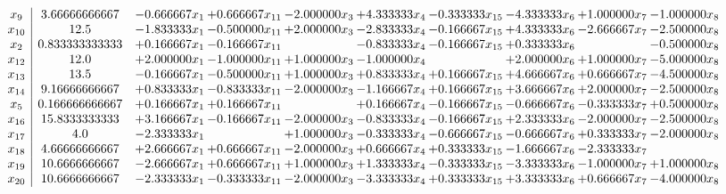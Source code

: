 \documentclass[10pt]{article}
\begin{document}
 \[\begin{array}{c| c c@{\hskip 2pt} c@{\hskip 2pt} c@{\hskip 2pt} c@{\hskip 2pt} c@{\hskip 2pt} c@{\hskip 2pt} c@{\hskip 2pt} c@{\hskip 2pt} }
 x_{9}   &  3.66666666667 & -0.666667 x_{1} & + 0.666667 x_{11} & -2.000000 x_{3} & + 4.333333 x_{4} & -0.333333 x_{15} & -4.333333 x_{6} & + 1.000000 x_{7} & -1.000000 x_{8}\\
 x_{10}   &  12.5 & -1.833333 x_{1} & -0.500000 x_{11} & + 2.000000 x_{3} & -2.833333 x_{4} & -0.166667 x_{15} & + 4.333333 x_{6} & -2.666667 x_{7} & -2.500000 x_{8}\\
 x_{2}   &  0.833333333333 & + 0.166667 x_{1} & -0.166667 x_{11} &   & -0.833333 x_{4} & -0.166667 x_{15} & + 0.333333 x_{6} &   & -0.500000 x_{8}\\
 x_{12}   &  12.0 & + 2.000000 x_{1} & -1.000000 x_{11} & + 1.000000 x_{3} & -1.000000 x_{4} &   & + 2.000000 x_{6} & + 1.000000 x_{7} & -5.000000 x_{8}\\
 x_{13}   &  13.5 & -0.166667 x_{1} & -0.500000 x_{11} & + 1.000000 x_{3} & + 0.833333 x_{4} & + 0.166667 x_{15} & + 4.666667 x_{6} & + 0.666667 x_{7} & -4.500000 x_{8}\\
 x_{14}   &  9.16666666667 & + 0.833333 x_{1} & -0.833333 x_{11} & -2.000000 x_{3} & -1.166667 x_{4} & + 0.166667 x_{15} & + 3.666667 x_{6} & + 2.000000 x_{7} & -2.500000 x_{8}\\
 x_{5}   &  0.166666666667 & + 0.166667 x_{1} & + 0.166667 x_{11} &   & + 0.166667 x_{4} & -0.166667 x_{15} & -0.666667 x_{6} & -0.333333 x_{7} & + 0.500000 x_{8}\\
 x_{16}   &  15.8333333333 & + 3.166667 x_{1} & -0.166667 x_{11} & -2.000000 x_{3} & -0.833333 x_{4} & -0.166667 x_{15} & + 2.333333 x_{6} & -2.000000 x_{7} & -2.500000 x_{8}\\
 x_{17}   &  4.0 & -2.333333 x_{1} &   & + 1.000000 x_{3} & -0.333333 x_{4} & -0.666667 x_{15} & -0.666667 x_{6} & + 0.333333 x_{7} & -2.000000 x_{8}\\
 x_{18}   &  4.66666666667 & + 2.666667 x_{1} & + 0.666667 x_{11} & -2.000000 x_{3} & + 0.666667 x_{4} & + 0.333333 x_{15} & -1.666667 x_{6} & -2.333333 x_{7} &   \\
 x_{19}   &  10.6666666667 & -2.666667 x_{1} & + 0.666667 x_{11} & + 1.000000 x_{3} & + 1.333333 x_{4} & -0.333333 x_{15} & -3.333333 x_{6} & -1.000000 x_{7} & + 1.000000 x_{8}\\
 x_{20}   &  10.6666666667 & -2.333333 x_{1} & -0.333333 x_{11} & -2.000000 x_{3} & -3.333333 x_{4} & + 0.333333 x_{15} & + 3.333333 x_{6} & + 0.666667 x_{7} & -4.000000 x_{8}\\

\end{array}\]
\end{document}
